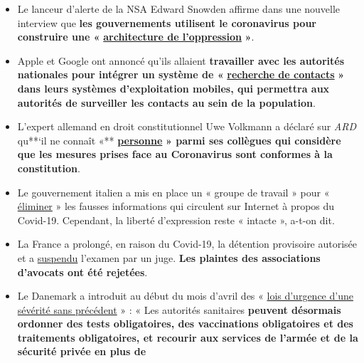 \begin{itemize}
\tightlist
\item
  Le lanceur d'alerte de la NSA Edward Snowden affirme dans une nouvelle
  interview que \textbf{les gouvernements utilisent le coronavirus pour
  construire une «}
  \href{https://www.vice.com/en_us/article/bvge5q/snowden-warns-governments-are-using-coronavirus-to-build-the-architecture-of-oppression}{\textbf{architecture
  de l'oppression}} \textbf{»}.
\item
  Apple et Google ont annoncé qu'ils allaient \textbf{travailler avec
  les autorités nationales pour intégrer un système de «}
  \href{https://www.bloomberg.com/news/articles/2020-04-10/apple-google-bring-covid-19-contact-tracing-to-3-billion-people}{\textbf{recherche
  de contacts}} \textbf{» dans leurs systèmes d'exploitation mobiles,
  qui permettra aux autorités de surveiller les contacts au sein de la
  population}.
\item
  L'expert allemand en droit constitutionnel Uwe Volkmann a déclaré sur
  \emph{ARD} qu**`il ne connaît «**
  \href{https://www.youtube.com/watch?v=DvzrGLvzllU}{\textbf{personne}}
  \textbf{» parmi ses collègues qui considère que les mesures prises
  face au Coronavirus sont conformes à la constitution}.
\item
  Le gouvernement italien a mis en place un « groupe de travail » pour «
  \href{https://www.faz.net/aktuell/feuilleton/medien/corona-in-italien-das-virus-und-die-wahrheit-16714529.htmlhttps://www.faz.net/aktuell/feuilleton/medien/corona-in-italien-das-virus-und-die-wahrheit-16714529.html}{éliminer}
  » les fausses informations qui circulent sur Internet à propos du
  Covid-19. Cependant, la liberté d'expression reste « intacte », a-t-on
  dit.
\item
  La France a prolongé, en raison du Covid-19, la détention provisoire
  autorisée et a
  \href{https://www.lefigaro.fr/politique/coronavirus-le-conseil-d-etat-sur-la-ligne-de-crete-des-libertes-publiques-20200406}{suspendu}
  l'examen par un juge. \textbf{Les plaintes des associations d'avocats
  ont été rejetées}.
\item
  Le Danemark a introduit au début du mois d'avril des «
  \href{https://www.fr.de/politik/coronavirus-sars-cov-2-daenemark-notfalls-militaer-13598503.html}{lois
  d'urgence d'une sévérité sans précédent} » : « Les autorités
  sanitaires \textbf{peuvent désormais ordonner des tests obligatoires,
  des vaccinations obligatoires et des traitements obligatoires, et
  recourir aux services de l'armée et de la sécurité privée en plus de
}
\end{itemize}

